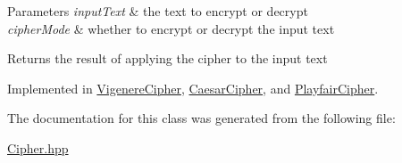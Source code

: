 \begin{DoxyParams}{Parameters}
{\em input\+Text} & the text to encrypt or decrypt \\
\hline
{\em cipher\+Mode} & whether to encrypt or decrypt the input text \\
\hline
\end{DoxyParams}
\begin{DoxyReturn}{Returns}
the result of applying the cipher to the input text 
\end{DoxyReturn}


Implemented in \hyperlink{class_vigenere_cipher_ad302e0a368a7f61368f0cfa894bdb792}{Vigenere\+Cipher}, \hyperlink{class_caesar_cipher_ad9c70da70e7c465189ab1750e97fae5d}{Caesar\+Cipher}, and \hyperlink{class_playfair_cipher_ac5e23f02becb84cb26d89dadeed87b05}{Playfair\+Cipher}.



The documentation for this class was generated from the following file\+:\begin{DoxyCompactItemize}
\item 
\hyperlink{_cipher_8hpp}{Cipher.\+hpp}\end{DoxyCompactItemize}
